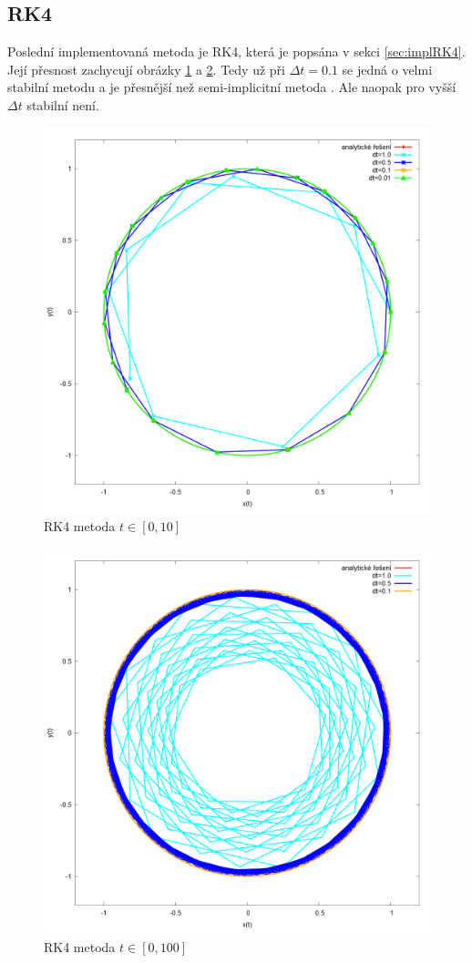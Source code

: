 \subsection{RK4}
Poslední implementovaná metoda je RK4, která je popsána v sekci \ref{sec:implRK4}. Její přesnost zachycují obrázky \ref{fig:RK4} a \ref{fig:RK4Stab}. Tedy už při $ \Delta t=0.1 $ se jedná o velmi stabilní metodu a je přesnější než semi-implicitní metoda . Ale naopak pro vyšší  $ \Delta t$ stabilní není.
\begin{figure}
	\caption{RK4 metoda $ t\in [0,10] $}
	\label{fig:RK4} 
	\centering
	\includegraphics[width=\linewidth]{Figs/RK4}
\end{figure}
\begin{figure}
	\caption{RK4 metoda $ t\in [0,100] $}
	\label{fig:RK4Stab} 
	\centering
	\includegraphics[width=\linewidth]{Figs/RK4Stab}
\end{figure}
\FloatBarrier

